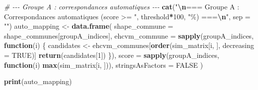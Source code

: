\documentclass[
]{article}
\newenvironment{Shaded}{\begin{snugshade}}{\end{snugshade}}
\newcommand{\AttributeTok}[1]{\textcolor[rgb]{0.13,0.29,0.53}{#1}}
\newcommand{\CommentTok}[1]{\textcolor[rgb]{0.56,0.35,0.01}{\textit{#1}}}
\newcommand{\ConstantTok}[1]{\textcolor[rgb]{0.56,0.35,0.01}{#1}}
\newcommand{\ControlFlowTok}[1]{\textcolor[rgb]{0.13,0.29,0.53}{\textbf{#1}}}
\newcommand{\DecValTok}[1]{\textcolor[rgb]{0.00,0.00,0.81}{#1}}
\newcommand{\FunctionTok}[1]{\textcolor[rgb]{0.13,0.29,0.53}{\textbf{#1}}}
\newcommand{\NormalTok}[1]{#1}
\newcommand{\OtherTok}[1]{\textcolor[rgb]{0.56,0.35,0.01}{#1}}
\newcommand{\SpecialCharTok}[1]{\textcolor[rgb]{0.81,0.36,0.00}{\textbf{#1}}}
\newcommand{\StringTok}[1]{\textcolor[rgb]{0.31,0.60,0.02}{#1}}
\begin{document}
\begin{Shaded}
\begin{Highlighting}[]
  \CommentTok{\# {-}{-}{-} Groupe A : correspondances automatiques {-}{-}{-}}
  \FunctionTok{cat}\NormalTok{(}\StringTok{"}\SpecialCharTok{\textbackslash{}n}\StringTok{=== Groupe A : Correspondances automatiques (score \textgreater{}= "}\NormalTok{, }
\NormalTok{      threshold}\SpecialCharTok{*}\DecValTok{100}\NormalTok{, }\StringTok{"\%) ===}\SpecialCharTok{\textbackslash{}n}\StringTok{"}\NormalTok{, }\AttributeTok{sep =} \StringTok{""}\NormalTok{)}
\NormalTok{  auto\_mapping }\OtherTok{\textless{}{-}} \FunctionTok{data.frame}\NormalTok{(}
    \AttributeTok{shape\_commune =}\NormalTok{ shape\_communes[groupA\_indices],}
    \AttributeTok{ehcvm\_commune =} \FunctionTok{sapply}\NormalTok{(groupA\_indices, }\ControlFlowTok{function}\NormalTok{(i) \{}
\NormalTok{      candidates }\OtherTok{\textless{}{-}}\NormalTok{ ehcvm\_communes[}\FunctionTok{order}\NormalTok{(sim\_matrix[i, ], }\AttributeTok{decreasing =} \ConstantTok{TRUE}\NormalTok{)]}
      \FunctionTok{return}\NormalTok{(candidates[}\DecValTok{1}\NormalTok{])}
\NormalTok{    \}),}
    \AttributeTok{score =} \FunctionTok{sapply}\NormalTok{(groupA\_indices, }\ControlFlowTok{function}\NormalTok{(i) }\FunctionTok{max}\NormalTok{(sim\_matrix[i, ])),}
    \AttributeTok{stringsAsFactors =} \ConstantTok{FALSE}
\NormalTok{  )}
  
  \FunctionTok{print}\NormalTok{(auto\_mapping)}
  

\end{Highlighting}
\end{Shaded}
\end{document}
